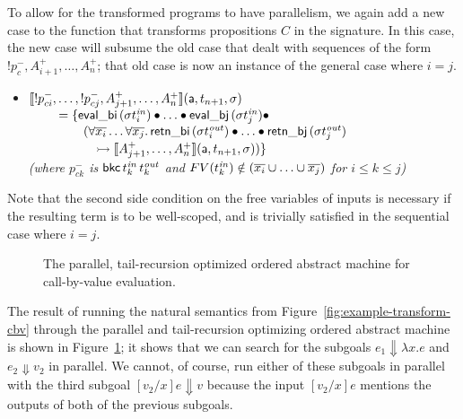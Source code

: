 To allow for the transformed programs to have parallelism, we again
add a new case to the function that transforms propositions $C$ in the
signature.  In this case, the new case will subsume the old
case that dealt with sequences of the form ${!}p_c^-,
A^+_{i+1},\ldots,A^+_n$; that old case is now an instance of the
general case where $i = j$. 

\begin{itemize}
\item $\llbracket {{!}p^-_{ci},\ldots,{!}p^-_{cj},A^+_{j+1},\ldots,A^+_n} \rrbracket({\sf a},{t_{n+1}},{\sigma})$
  \\
  $~ \qquad = \{ {\sf eval\_bi}\,({\sigma}t^{\it in}_i) 
                    \mathbin{\bullet} \ldots \mathbin{\bullet}
                 {\sf eval\_bj}\,({\sigma}t^{\it in}_j) \mathbin{\bullet} ~$
  \\
  $~ \qquad \qquad (\forall\overline{x_i}\ldots\forall\overline{x_j}.\, 
     {\sf retn\_bi}\,(\sigma{t^{\it out}_i})
     \mathbin{\bullet} \ldots \mathbin{\bullet} 
     {\sf retn\_bj}\,(\sigma{t^{\it out}_j})$
  \\
  $~ \qquad \qquad \quad
   \rightarrowtail \llbracket {A^+_{j+1},\ldots,A^+_n} \rrbracket({\sf a},{t_{n+1}},{\sigma})) \}$\\
  {\it (where
   $p^-_{ck}$ is ${\sf bkc}\,t^{\it in}_k\,t^{\it out}_k$ 
   and $FV(t_k^{\it in}) \notin (\overline{x_i} \cup \ldots \cup \overline{x_j})$ 
   for $i \leq k \leq j$)}
\end{itemize}

\noindent
Note that the second side condition on the free variables of inputs is
necessary if the resulting term is to be well-scoped, and is trivially 
satisfied in the sequential case where $i = j$. 

\begin{figure}
\caption{The parallel, tail-recursion optimized ordered abstract machine for
 call-by-value evaluation.}
\label{fig:cbv-ev-ssos-par}
\end{figure}

The result of running the natural semantics from
Figure~\ref{fig:example-transform-cbv} through the parallel and
tail-recursion optimizing ordered abstract machine is shown in
Figure~\ref{fig:cbv-ev-ssos-par}; it shows that we can
search for the subgoals $e_1 \Downarrow \lambda x.e$ and
$e_2 \Downarrow v_2$ in parallel. We cannot, of course, run either
of these subgoals in parallel with the third subgoal 
$[v_2/x]e \Downarrow v$ because the input $[v_2/x]e$ mentions the outputs
of both of the previous subgoals. 

